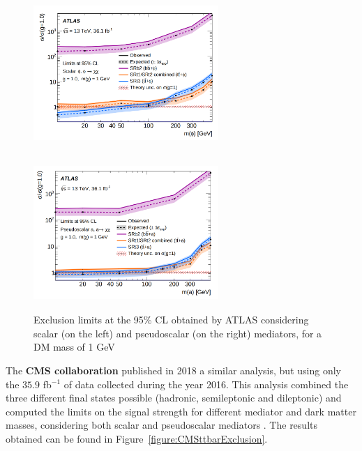 \documentclass[a4paper, 10pt, openright]{report}
\begin{document}
\begin{figure}[htbp]
\centering
\begin{minipage}[b]{.4\textwidth}
\includegraphics[width=7cm, height=6cm]{figs/Atlas36a.png}
\end{minipage}\hfill
\begin{minipage}[b]{.48\textwidth}
\includegraphics[width=7cm, height=5.88cm]{figs/Atlas36b.png}
\end{minipage}\hfill
\caption{Exclusion limits at the 95\% \ac{CL} obtained by \ac{ATLAS} considering  scalar (on the left) and pseudoscalar (on the right) mediators, for a \ac{DM} mass of 1 GeV \cite{PreviousDoubleTopBottomAllLep13ATLAS}}\label{fig:atlas36}
\end{figure}

The \textbf{\ac{CMS} collaboration} published in 2018 a similar analysis, but using only the $35.9$ fb$^{-1}$ of data collected during the year 2016. This analysis combined the three different final states possible (hadronic, semileptonic and dileptonic) and computed the limits on the signal strength for different mediator and dark matter masses, considering both scalar and pseudoscalar mediators \cite{PreviousDoubleTopAllLep13CMS}. The results obtained can be found in Figure~\ref{figure:CMSttbarExclusion}. 
\end{document}
